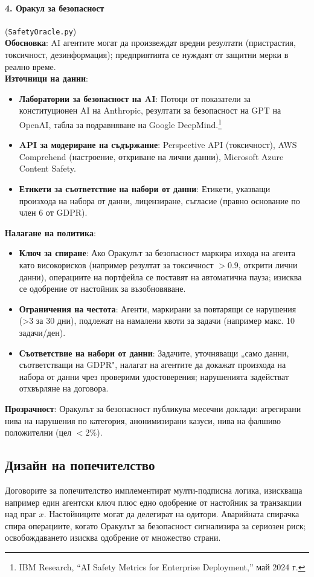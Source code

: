 \documentclass[11pt]{article}
\begin{document}
\paragraph{4. Оракул за безопасност} (\texttt{SafetyOracle.py})\\
\textbf{Обосновка}: AI агентите могат да произвеждат вредни резултати (пристрастия, токсичност, дезинформация); предприятията се нуждаят от защитни мерки в реално време.\\
\textbf{Източници на данни}:
\begin{itemize}[noitemsep]
  \item \textbf{Лаборатории за безопасност на AI}: Потоци от показатели за конституционен AI на Anthropic, резултати за безопасност на GPT на OpenAI, табла за подравняване на Google DeepMind.\footnote{IBM Research, ``AI Safety Metrics for Enterprise Deployment,'' май 2024 г.}
  \item \textbf{API за модериране на съдържание}: Perspective API (токсичност), AWS Comprehend (настроение, откриване на лични данни), Microsoft Azure Content Safety.
  \item \textbf{Етикети за съответствие на набори от данни}: Етикети, указващи произхода на набора от данни, лицензиране, съгласие (правно основание по член 6 от GDPR).
\end{itemize}
\textbf{Налагане на политика}:
\begin{itemize}[noitemsep]
  \item \textbf{Ключ за спиране}: Ако Оракулът за безопасност маркира изхода на агента като високорисков (например резултат за токсичност $>0.9$, открити лични данни), операциите на портфейла се поставят на автоматична пауза; изисква се одобрение от настойник за възобновяване.
  \item \textbf{Ограничения на честота}: Агенти, маркирани за повтарящи се нарушения (>3 за 30 дни), подлежат на намалени квоти за задачи (например макс. 10 задачи/ден).
  \item \textbf{Съответствие на набори от данни}: Задачите, уточняващи „само данни, съответстващи на GDPR", налагат на агентите да докажат произхода на набора от данни чрез проверими удостоверения; нарушенията задействат отхвърляне на договора.
\end{itemize}
\textbf{Прозрачност}: Оракулът за безопасност публикува месечни доклади: агрегирани нива на нарушения по категория, анонимизирани казуси, нива на фалшиво положителни (цел $<2\%$).

\subsection{Дизайн на попечителство}
Договорите за попечителство имплементират мулти-подписна логика, изискваща например един агентски ключ плюс едно одобрение от настойник за транзакции над праг $x$. Настойниците могат да делегират на одитори. Аварийната спирачка спира операциите, когато Оракулът за безопасност сигнализира за сериозен риск; освобождаването изисква одобрение от множество страни.
\end{document}

